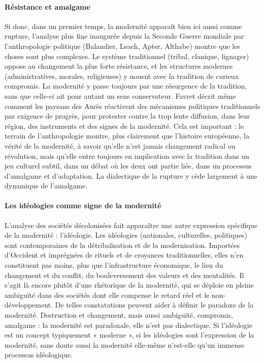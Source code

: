 \paragraph{Résistance et amalgame}
 
Si donc, dans un premier temps, la modernité apparaît bien ici aussi comme rupture, l'analyse plus fine inaugurée depuis la Seconde Guerre mondiale par l'anthropologie politique (Balandier, Leach, Apter, Althabe) montre que les choses sont plus complexes. Le système traditionnel (tribal, clanique, lignager) oppose au changement la plus forte résistance, et les structures modernes (administratives, morales, religieuses) y nouent avec la tradition de curieux compromis. La modernité y passe toujours par une résurgence de la tradition, sans que celle-ci ait pour autant un sens conservateur. Favret décrit même comment les paysans des Aurès réactivent des mécanismes politiques traditionnels par exigence de progrès, pour protester contre la trop lente diffusion, dans leur région, des instruments et des signes de la modernité.
Cela est important : le terrain de l'anthropologie montre, plus clairement que l'histoire européenne, la vérité de la modernité, à savoir qu'elle n'est jamais changement radical ou révolution, mais qu'elle entre toujours en implication avec la tradition dans un jeu culturel subtil, dans un débat où les deux ont partie liée, dans un processus d'amalgame et d'adaptation. La dialectique de la rupture y cède largement à une dynamique de l'amalgame.
\paragraph{Les idéologies comme signe de la modernité}

L'analyse des sociétés décolonisées fait apparaître une autre expression spécifique de la modernité : l'idéologie. Les idéologies (nationales, culturelles, politiques) sont contemporaines de la détribalisation et de la modernisation. Importées d'Occident et imprégnées de rituels et de croyances traditionnelles, elles n'en constituent pas moins, plus que l'infrastructure économique, le lieu du changement et du conflit, du bouleversement des valeurs et des mentalités. Il s'agit là encore plutôt d'une rhétorique de la modernité, qui se déploie en pleine ambiguïté dans des sociétés dont elle compense le retard réel et le non- développement.
De telles constatations peuvent aider à définir le paradoxe de la modernité. Destruction et changement, mais aussi ambiguïté, compromis, amalgame : la modernité est paradoxale, elle n'est pas dialectique. Si l'idéologie est un concept typiquement « moderne », si les idéologies sont l'expression de la modernité, sans doute aussi la modernité elle-même n'est-elle qu'un immense processus idéologique.

